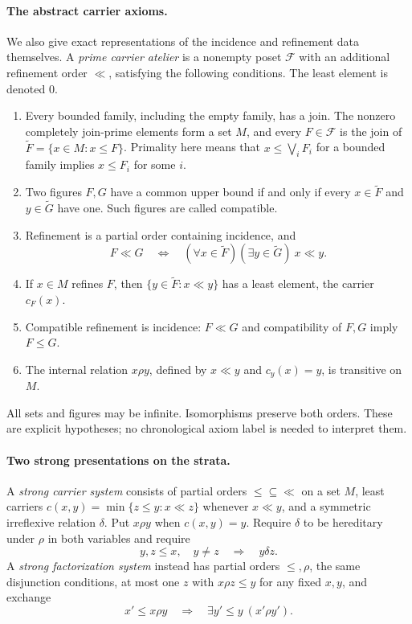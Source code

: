 \paragraph{The abstract carrier axioms.}
We also give exact representations of the incidence and refinement
data themselves. A \emph{prime carrier atelier} is a nonempty poset
$\mathscr F$ with an additional refinement order $\ll$, satisfying
the following conditions. The least element is denoted $0$.
\begin{enumerate}
\item Every bounded family, including the empty family, has a join.
The nonzero completely join-prime elements form a set $M$, and
every $F\in\mathscr F$ is the join of
$\widetilde F=\{x\in M:x\leq F\}$.
Primality here means that $x\leq\bigvee_iF_i$ for a bounded
family implies $x\leq F_i$ for some $i$.
\item Two figures $F,G$ have a common upper bound if and only if
every $x\in\widetilde F$ and $y\in\widetilde G$ have one.
Such figures are called compatible.
\item Refinement is a partial order containing incidence, and
\[
 F\ll G\quad\Longleftrightarrow\quad
 (\forall x\in\widetilde F)(\exists y\in\widetilde G)\ x\ll y.
\]
\item If $x\in M$ refines $F$, then
$\{y\in\widetilde F:x\ll y\}$ has a least element, the carrier
$c_F(x)$.
\item Compatible refinement is incidence: $F\ll G$ and
compatibility of $F,G$ imply $F\leq G$.
\item The internal relation $x\rho y$, defined by $x\ll y$
and $c_y(x)=y$, is transitive on $M$.
\end{enumerate}
All sets and figures may be infinite. Isomorphisms preserve both
orders. These are explicit hypotheses; no chronological axiom
label is needed to interpret them.

\paragraph{Two strong presentations on the strata.}
A \emph{strong carrier system} consists of partial orders
$\leq\subseteq\ll$ on a set $M$, least carriers
$c(x,y)=\min\{z\leq y:x\ll z\}$ whenever $x\ll y$,
and a symmetric irreflexive relation $\delta$. Put
$x\rho y$ when $c(x,y)=y$. Require $\delta$ to be hereditary
under $\rho$ in both variables and require
\begin{equation}\label{eq:principal-disjoint}
 y,z\leq x,\quad y\ne z\quad\Longrightarrow\quad y\delta z.
\end{equation}
A \emph{strong factorization system} instead has partial orders
$\leq,\rho$, the same disjunction conditions, at most one $z$
with $x\rho z\leq y$ for any fixed $x,y$, and exchange
\begin{equation}\label{eq:carrier-exchange}
 x'\leq x\rho y\quad\Longrightarrow\quad
 \exists y'\leq y\ (x'\rho y').
\end{equation}

